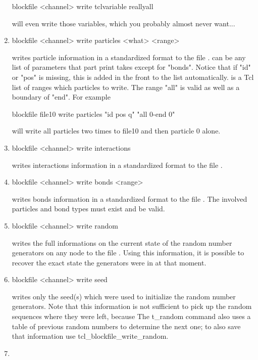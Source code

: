 \begin{enumerate}
\begin{code}
blockfile <channel> write tclvariable reallyall
\end{code}
  will even write those variables, which you probably almost never want...
 \item
\begin{code}
blockfile <channel> write particles <what> <range>
\end{code}
writes particle information in a standardized format to the file
.  can be any list of parameters that part
 print takes except for "bonds". Notice that if "id" or "pos"
is missing, this is added in the front to the list automatically.
 is a Tcl list of ranges which particles to write. The
range "all" is valid as well as a boundary of "end". For example
\begin{code}
 blockfile file10 write particles "id pos q" "all 0-end 0" 
\end{code}
  will write all particles two times to file10 and then particle 0 alone.
 \item
\begin{code}
 blockfile <channel> write interactions
\end{code}
  writes interactions information in a standardized format to the file .
 \item
\begin{code}
blockfile <channel> write bonds <range>
\end{code}
writes bonds information in a standardized format to the file
. The involved particles and bond types must exist and be
valid.
 \item
\begin{code}
blockfile <channel> write random
\end{code}
writes the full informations on the current state of the random number
generators on any node to the file . Using this
information, it is possible to recover the exact state the generators
were in at that moment.
 \item
\begin{code}
blockfile <channel> write seed
\end{code}
writes only the seed(s) which were used to initialize the random
number generators. Note that this information is not sufficient to
pick up the random sequences where they were left, because The
t\_random command also uses a table of previous random numbers to
determine the next one; to also save that information use
tcl\_blockfile\_write\_random.
 \item

\end{enumerate}
